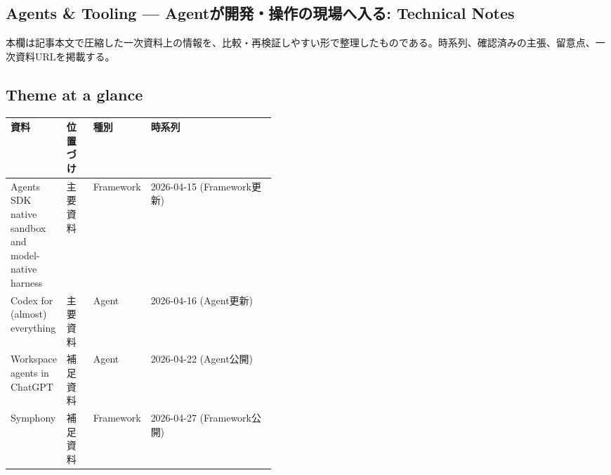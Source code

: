 \subsection*{Agents \& Tooling — Agentが開発・操作の現場へ入る: Technical Notes}
本欄は記事本文で圧縮した一次資料上の情報を、比較・再検証しやすい形で整理したものである。時系列、確認済みの主張、留意点、一次資料URLを掲載する。
\medskip
\subsection*{Theme at a glance}
\begin{center}
\footnotesize
\begin{tabularx}{\linewidth}{@{}p{0.20\linewidth}p{0.10\linewidth}p{0.14\linewidth}X@{}}
\toprule
資料 & 位置づけ & 種別 & 時系列 \\
\midrule
Agents SDK native sandbox and model-native harness & 主要資料 & Framework & 2026-04-15 (Framework更新) \\
Codex for (almost) everything & 主要資料 & Agent & 2026-04-16 (Agent更新) \\
Workspace agents in ChatGPT & 補足資料 & Agent & 2026-04-22 (Agent公開) \\
Symphony & 補足資料 & Framework & 2026-04-27 (Framework公開) \\
\bottomrule
\end{tabularx}
\end{center}
\normalsize

